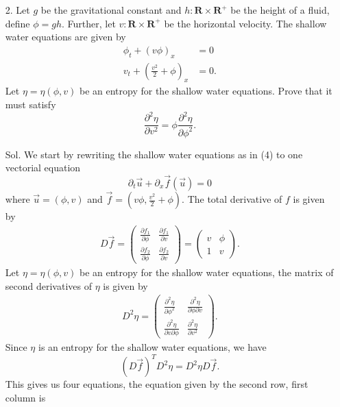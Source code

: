 \documentclass[]{report}
\begin{document}
\begin{itemize}
	\item[2.] Let $g$ be the gravitational constant and $h : \mathbf{R} \times \mathbf{R}^{+}$ be the height of a fluid, define $\phi = gh$. Further, let $v : \mathbf{R} \times \mathbf{R}^{+}$ be the horizontal velocity. The shallow water equations are
	given by
	\begin{equation}
	\begin{split}
		\phi_t +(v\phi)_x &= 0\\
		v_t + \left(\frac{v^2}{2}+\phi\right)_x&=0.
	\end{split}
	\end{equation}
	Let $\eta = \eta(\phi, v)$ be an entropy for the shallow water equations. Prove that it must satisfy
	\begin{equation}
		\frac{\partial^2\eta}{\partial v^2} = \phi \frac{\partial^2\eta}{\partial\phi^2}.
	\end{equation}
	\item[Sol.] We start by rewriting the shallow water equations as in (4) to one vectorial equation
	\[\partial_t\vec{u}+\partial_x \vec{f}(\vec{u})=0\]
	where $\vec{u}=(\phi,v)$ and $\vec{f}=(v\phi,\frac{v^2}{2}+\phi)$. The total derivative of $f$ is given by
	\begin{align*}
		D\vec{f}=\begin{pmatrix}
		\frac{\partial f_1}{\partial \phi}	& \frac{\partial f_1}{\partial v}\\
		\frac{\partial f_2}{\partial \phi}	& \frac{\partial f_2}{\partial v}\end{pmatrix}
		=\begin{pmatrix}
		v	& \phi\\
		1	& v
		\end{pmatrix}.
	\end{align*}
	Let $\eta = \eta(\phi, v)$ be an entropy for the shallow water equations, the matrix of second derivatives of $\eta$ is given by
	\begin{align*}
	D^2\eta=\begin{pmatrix}
	\frac{\partial^2 \eta}{\partial \phi^2}	& \frac{\partial^2 \eta}{\partial \phi \partial v}\\
	\frac{\partial^2 \eta}{\partial v \partial \phi}	& \frac{\partial^2  \eta}{\partial v^2}\end{pmatrix}.
	\end{align*}
	Since $\eta$ is an entropy for the shallow water equations, we have
	\[(D\vec{f})^T D^2\eta = D^2 \eta D\vec{f}.\]
	This gives us four equations, the equation given by the second row, first column is

\end{itemize}
\end{document}
